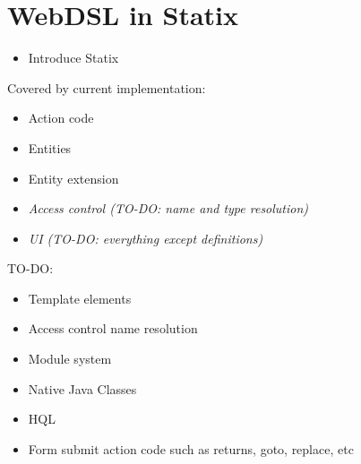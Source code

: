 
\chapter{\label{chap:statix}WebDSL in Statix}

  \begin{itemize}
    \item Introduce Statix
  \end{itemize}

  \autocite{HEMEL2011150}


  Covered by current implementation:
  \begin{itemize}
    \item Action code
    \item Entities
    \item Entity extension
    \item \emph{Access control (TO-DO: name and type resolution)}
    \item \emph{UI (TO-DO: everything except definitions)}
  \end{itemize}

  TO-DO:
  \begin{itemize}
    \item Template elements
    \item Access control name resolution
    \item Module system
    \item Native Java Classes
    \item HQL
    \item Form submit action code such as returns, goto, replace, etc
  \end{itemize}
